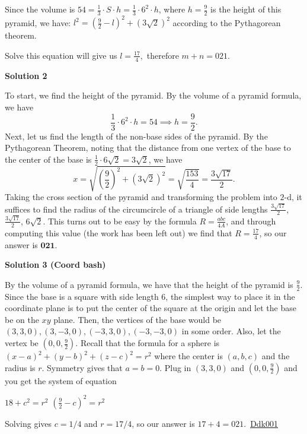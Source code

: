 \begin{enumerate}
 Since the volume is $54 = \frac{1}{3} \cdot S \cdot h = \frac{1}{3} \cdot 6^2 \cdot h$, where $h=\frac{9}{2}$ is the height of this pyramid, we have: $l^2=\left(\frac{9}{2}-l\right)^2+\left(3\sqrt{2}\right)^2$ according to the Pythagorean theorem.

 Solve this equation will give us $l = \frac{17}{4},$ therefore $m+n=\boxed{021}.$




\textbf{Solution 2}

To start, we find the height of the pyramid. By the volume of a pyramid formula, we have 
 \[\frac13 \cdot 6^2 \cdot h=54 \implies h=\frac92.\] Next, let us find the length of the non-base sides of the pyramid. By the Pythagorean Theorem, noting that the distance from one vertex of the base to the center of the base is $\frac12 \cdot 6\sqrt2=3\sqrt2$, we have 
 \[x=\sqrt{\left(\frac92\right)^2+(3\sqrt2)^2}=\sqrt{\frac{153}4}=\frac{3\sqrt{17}}2.\] Taking the cross section of the pyramid and transforming the problem into $2$-d, it suffices to find the radius of the circumcircle of a triangle of side lengths $\frac{3\sqrt{17}}2$, $\frac{3\sqrt{17}}2$, $6\sqrt2$. This turns out to be easy by the formula $R=\frac{abc}{4A}$, and through computing this value (the work has been left out) we find that $R=\frac{17}4$, so our answer is $\boxed{\textbf{021}}$.

 



\textbf{Solution 3 (Coord bash)}

By the volume of a pyramid formula, we have that the height of the pyramid is $\frac{9}{2}$. Since the base is a square with side length 6, the simplest way to place it in the coordinate plane is to put the center of the square at the origin and let the base be on the $xy$ plane. Then, the vertices of the base would be $(3,3,0), (3,-3,0), (-3,3,0), (-3,-3,0)$ in some order. Also, let the vertex be  $(0,0,\frac{9}{2})$. Recall that the formula for a sphere is $(x-a)^2+(y-b)^2+(z-c)^2=r^2$ where the center is $(a,b,c)$ and the radius is $r$. Symmetry gives that $a=b=0$. Plug in $(3,3,0)$ and $(0,0,\frac{9}{2})$ and you get the system of equation 

 $18+c^2=r^2$
$(\frac{9}{2}-c)^2=r^2$

 Solving gives $c=1/4$ and $r=17/4$, so our answer is $17+4=\boxed{021}$.~\href{https://artofproblemsolving.com/wiki/index.php?title=Ddk001}{Ddk001}

 




\end{enumerate}
